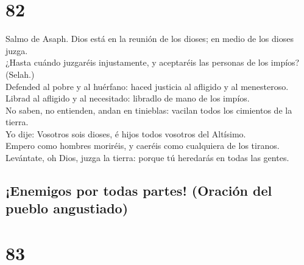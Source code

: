 \hypertarget{section-19-82}{%
\section{82}\label{section-19-82}}

 Salmo de Asaph. Dios está en la reunión de los dioses; en
medio de los dioses juzga.\\
 ¿Hasta cuándo juzgaréis injustamente, y aceptaréis las
personas de los impíos? (Selah.)\\
 Defended al pobre y al huérfano: haced justicia al
afligido y al menesteroso.\\
 Librad al afligido y al necesitado: libradlo de mano de
los impíos.\\
 No saben, no entienden, andan en tinieblas: vacilan todos
los cimientos de la tierra.\\
 Yo dije: Vosotros sois dioses, é hijos todos vosotros del
Altísimo.\\
 Empero como hombres moriréis, y caeréis como cualquiera
de los tiranos.\\
 Levántate, oh Dios, juzga la tierra: porque tú heredarás
en todas las gentes.

\hypertarget{enemigos-por-todas-partes-oraciuxf3n-del-pueblo-angustiado}{%
\subsection{¡Enemigos por todas partes! (Oración del pueblo
angustiado)}\label{enemigos-por-todas-partes-oraciuxf3n-del-pueblo-angustiado}}

\hypertarget{section-19-83}{%
\section{83}\label{section-19-83}}

